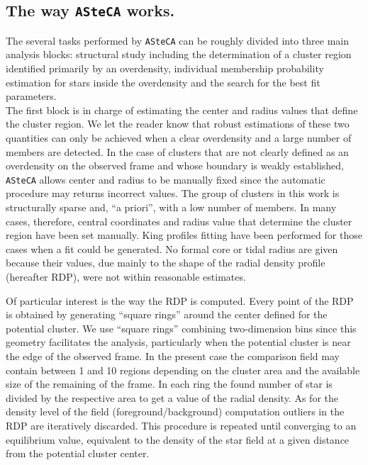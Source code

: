 \documentclass{aa}
\begin{document}
\subsection{The way \texttt{ASteCA} works.}
\label{ssec:asteca_works}

The several tasks performed by \texttt{ASteCA} can be roughly divided into three
main analysis blocks: structural study including the determination of a cluster
region identified primarily by an overdensity, individual membership probability
estimation for stars inside the overdensity and the search for the best fit
parameters.\\

The first block is in charge of estimating the center and radius values that
define the cluster region. We let the reader know that robust estimations
of these two quantities can only be achieved when a clear overdensity and a
large number of members are detected. In the case of clusters that are not
clearly defined as an overdensity on the observed frame and whose boundary is
weakly established, \texttt{ASteCA} allows center and radius to be manually
fixed since the automatic procedure may returns incorrect values. The group of
clusters in this work is structurally sparse and, ``a priori'', with a low
number of members.
In many cases, therefore, central coordinates and radius value that
determine the cluster region have been set manually. King profiles fitting have
been performed for those cases when a fit could be generated. No formal core or
tidal radius are given because their values, due mainly to the shape of the
radial density profile (hereafter RDP), were not within reasonable estimates.

Of particular interest is the way the RDP is computed. Every point of the RDP is
obtained by generating ``square rings'' around the center defined for the
potential cluster. We use ``square rings'' combining two-dimension bins since
this geometry facilitates the analysis, particularly when the potential cluster
is near the edge of the observed frame. In the present case the comparison field
may contain between 1 and 10 regions depending on the cluster area and the
available size of the remaining of the frame. In each ring the found number of
star is divided by the respective area to get a value of the radial density. As
for the density level of the field (foreground/background) computation outliers
in the RDP are iteratively discarded. This procedure is repeated until
converging to an equilibrium value, equivalent to the density of the star field
at a given distance from the potential cluster center.\\
\end{document}
